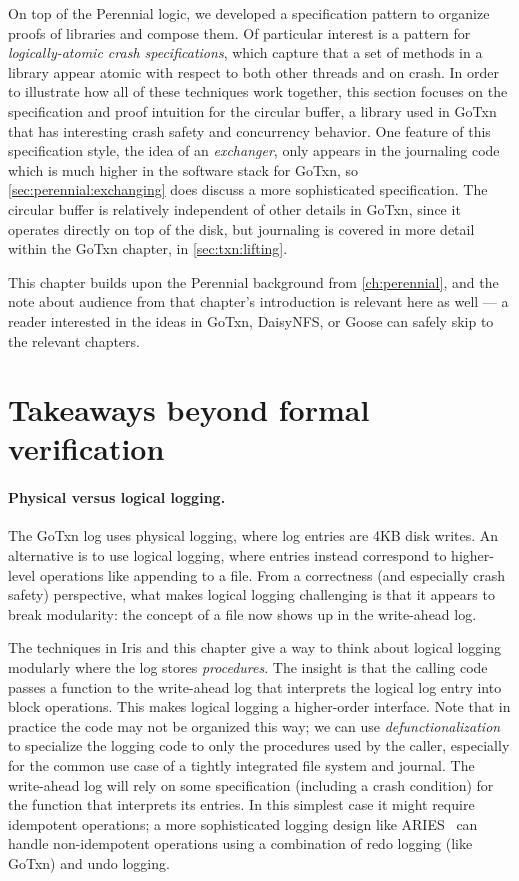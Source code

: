 On top of the Perennial logic, we developed a specification pattern to organize
proofs of libraries and compose them. Of particular interest is a pattern for
\emph{logically-atomic crash specifications}, which capture that a set of
methods in a library appear atomic with respect to both other threads and on
crash. In order to illustrate how all of these techniques work together, this
section focuses on the specification and proof intuition for the circular
buffer, a library used in GoTxn that has interesting crash safety and
concurrency behavior. One feature of this specification style, the idea of an
\emph{exchanger}, only appears in the journaling code which is much higher in
the software stack for GoTxn, so \cref{sec:perennial:exchanging} does discuss a
more sophisticated specification. The circular buffer is relatively independent
of other details in GoTxn, since it operates directly on top of the disk, but
journaling is covered in more detail within the GoTxn chapter, in
\cref{sec:txn:lifting}.

This chapter builds upon the Perennial background from \cref{ch:perennial}, and
the note about audience from that chapter's introduction is relevant here as
well --- a reader interested in the ideas in GoTxn, DaisyNFS, or Goose can
safely skip to the relevant chapters.




\section{Takeaways beyond formal verification}

\paragraph{Physical versus logical logging.} The GoTxn log uses physical
logging, where log entries are 4KB disk writes. An alternative is to use logical
logging, where entries instead correspond to higher-level operations like
appending to a file. From a correctness (and especially crash safety)
perspective, what makes logical logging challenging is that it appears to break
modularity: the concept of a file now shows up in the write-ahead log.

The techniques in Iris and this chapter give a way to think about logical
logging modularly where the log stores \emph{procedures}. The insight is that
the calling code passes a function to the write-ahead log that interprets the
logical log entry into block operations. This makes logical logging a
higher-order interface. Note that in practice the code may not be organized this
way; we can use \emph{defunctionalization} to specialize the logging code to
only the procedures used by the caller, especially for the common use case of a
tightly integrated file system and journal. The write-ahead log will rely on
some specification (including a crash condition) for the function that
interprets its entries. In this simplest case it might require idempotent
operations; a more sophisticated logging design like ARIES~\cite{mohan:aries}
can handle non-idempotent operations using a combination of redo logging (like
GoTxn) and undo logging.
